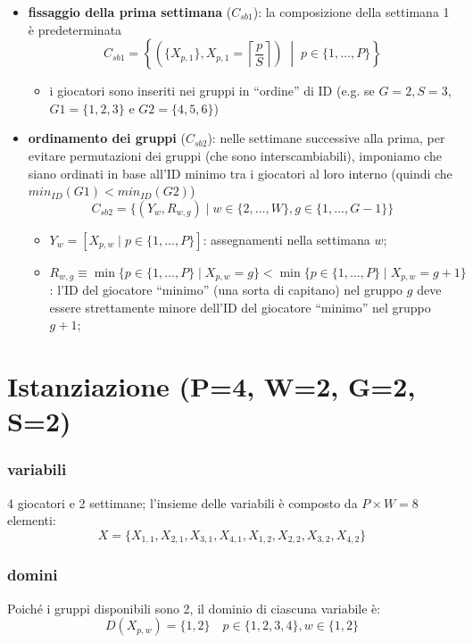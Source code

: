 \documentclass[12pt]{article}
\begin{document}
    \begin{itemize}
\item \textbf{fissaggio della prima settimana} ($C_{sb1}$): la composizione della settimana 1 è predeterminata
$$
        C_{sb1} = \left\{ \left( \{X_{p, 1}\}, X_{p, 1} = \left\lceil \frac{p}{S} \right\rceil \right) \;\middle|\; p \in \{1, \dots, P\} \right\}
$$
\begin{itemize}
    \item i giocatori sono inseriti nei gruppi in ``ordine'' di ID (e.g. se $G=2, S=3$, $G1 = \{1, 2, 3\}$ e $G2 = \{4, 5, 6\}$)
\end{itemize}

\item \textbf{ordinamento dei gruppi} ($C_{sb2}$): nelle settimane successive alla prima, per evitare permutazioni dei gruppi (che sono interscambiabili), imponiamo che siano ordinati in base all'ID minimo tra i giocatori al loro interno (quindi che $min_{ID}(G1) < min_{ID}(G2)$)
$$C_{sb2} = \{ (Y_w, R_{w,g}) \mid w \in \{2, \dots, W\}, g \in \{1, \dots, G-1\} \}$$


\begin{itemize}
    \item $Y_w = [ X_{p,w} \mid p \in \{1, \dots, P\} ]$: assegnamenti nella settimana $w$;
    \item $R_{w,g} \equiv \min \{ p \in \{1, \dots, P\} \mid X_{p,w} = g \} < \min \{ p \in \{1, \dots, P\} \mid X_{p,w} = g+1 \}$: l'ID del giocatore ``minimo'' (una sorta di capitano) nel gruppo $g$ deve essere strettamente minore dell'ID del giocatore ``minimo'' nel gruppo $g+1$;
\end{itemize}
    \end{itemize}

\section{Istanziazione (P=4, W=2, G=2, S=2)}

\subsubsection*{variabili}
4 giocatori e 2 settimane; l'insieme delle variabili è composto da $P \times W = 8$ elementi:
$$X = \{ X_{1,1}, X_{2,1}, X_{3,1}, X_{4,1}, X_{1,2}, X_{2,2}, X_{3,2}, X_{4,2} \}$$

\subsubsection*{domini}
Poiché i gruppi disponibili sono 2, il dominio di ciascuna variabile è:
$$D(X_{p,w}) = \{1, 2\} \quad  p \in \{1, 2, 3, 4\},  w \in \{1, 2\}$$
\end{document}
